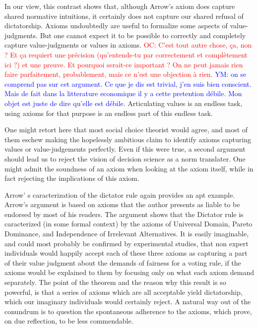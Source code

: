 \documentclass[preprint, french, english, 11pt]{elsarticle}%
\newcommand{\commentYM}[1]{\textcolor{blue}{YM: #1}}
\newcommand{\commentOC}[1]{\textcolor{red}{OC: #1}}
\begin{document}
In our view, this contrast shows that, although Arrow's axiom does capture shared normative intuitions, it certainly does not capture our shared refusal of dictatorship. Axioms undoubtedly are useful to formalize some aspects of value-judgments. But one cannot expect it to be possible to correctly and completely capture value-judgments or values in axioms. 
\commentOC{C’est tout autre chose, ça, non ? Et ça requiert une précision (qu’entends-tu par correctement et complètement ici ?) et une preuve. Et pourquoi serait-ce important ? On ne peut jamais rien faire parfaitement, probablement, mais ce n’est une objection à rien.} \commentYM{on se comprend pas sur cet argument. Ce que je dis est trivial, j'en suis bien conscient. Mais de fait dans la litterature economique il y a cette pretention débile. Mon objet est juste de dire qu'elle est débile.}
Articulating values is an endless task, using axioms for that purpose is an endless part of this endless task.

One might retort here that most social choice theorist would agree, and most of them eschew making the hopelessly ambitious claim to identify axioms capturing values or value-judgements perfectly. Even if this were true, a second argument should lead us to reject the vision of decision science as a norm translater. One might admit the soundness of an axiom when looking at the axiom itself, while in fact rejecting the implications of this axiom.

Arrow' s  caracterization of the dictator rule \cite{arrow_social_2012} again provides an apt example. Arrow's argument is based on axioms that the author presents as liable to be endorsed by most of his readers. The argument shows that the Dictator rule is caracterized (in some formal context) by the axioms of Universal Domain, Pareto Dominance, and Independence of Irrelevant Alternatives. It is easily imaginable, and could most probably be confirmed by experimental studies, that non expert individuals would happily accept each of these three axioms as capturing a part of their value judgment about the demands of fairness for a voting rule, if the axioms would be explained to them by focusing only on what each axiom demand separately. The point of the theorem and the reason why this result is so powerful, is that a series of axioms which are all acceptable yield dictatorship, which our imaginary individuals would certainly reject. A natural way out of the conundrum is to question the spontaneous adherence to the axioms, which prove, on due reflection, to be less commendable.
\end{document}
